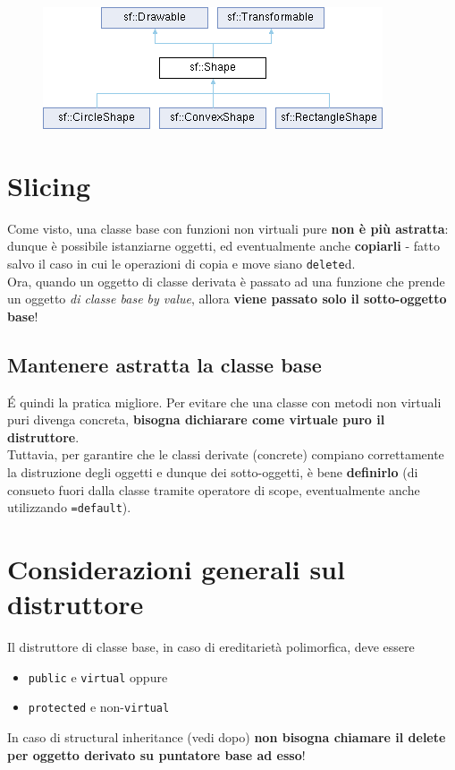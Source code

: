 \documentclass[10pt, oneside]{book}
\begin{document}
\begin{figure}[h!]
\centering
\includegraphics[scale=0.8]{sfml.png}
\end{figure}

\section{Slicing}
Come visto, una classe base con funzioni non virtuali pure \textbf{non è più astratta}: dunque è possibile istanziarne oggetti, ed eventualmente anche \textbf{copiarli} - fatto salvo il caso in cui le operazioni di copia e move siano \texttt{delete}d.\\
Ora, quando un oggetto di classe derivata è passato ad una funzione che prende un oggetto \textit{di classe base by value}, allora \textbf{viene passato solo il sotto-oggetto base}!

\subsection{Mantenere astratta la classe base}
\'E quindi la pratica migliore. Per evitare che una classe con metodi non virtuali puri divenga concreta, \textbf{bisogna dichiarare come virtuale puro il distruttore}.\\
Tuttavia, per garantire che le classi derivate (concrete) compiano correttamente la distruzione degli oggetti e dunque dei sotto-oggetti, è bene \textbf{definirlo} (di consueto fuori dalla classe tramite operatore di scope, eventualmente anche utilizzando \texttt{=default}).

\section{Considerazioni generali sul distruttore}
Il distruttore di classe base, in caso di ereditarietà polimorfica, deve essere
\begin{itemize}
\item \texttt{public} e \texttt{virtual} oppure
\item \texttt{protected} e non-\texttt{virtual}
\end{itemize}
In caso di structural inheritance (vedi dopo) \textbf{non bisogna chiamare il delete per oggetto derivato su puntatore base ad esso}!
\end{document}
